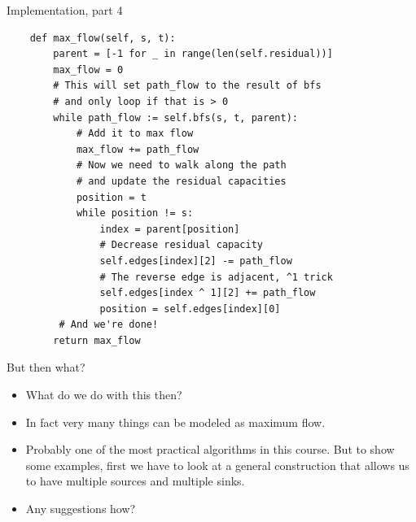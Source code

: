 \documentclass{beamer}
\begin{document}
\begin{frame}{Implementation, part 4}
\begin{scriptsize}
\begin{verbatim}
    def max_flow(self, s, t):
        parent = [-1 for _ in range(len(self.residual))]
        max_flow = 0
        # This will set path_flow to the result of bfs
        # and only loop if that is > 0
        while path_flow := self.bfs(s, t, parent):
            # Add it to max flow
            max_flow += path_flow
            # Now we need to walk along the path
            # and update the residual capacities
            position = t
            while position != s:
                index = parent[position]
                # Decrease residual capacity
                self.edges[index][2] -= path_flow
                # The reverse edge is adjacent, ^1 trick
                self.edges[index ^ 1][2] += path_flow
                position = self.edges[index][0]
         # And we're done!
        return max_flow
\end{verbatim}
		\end{scriptsize}
	\end{frame}
	
	\begin{frame}[plain]{But then what?}
		\begin{itemize}
			\item What do we do with this then?
			\item In fact very many things can be modeled as maximum flow.
			\item Probably one of the most practical algorithms in this course. But to show some examples, first we have to look at a general construction that allows us to have multiple sources and multiple sinks.
			\item Any suggestions how?
		\end{itemize}
	\end{frame}
	
\end{document}
